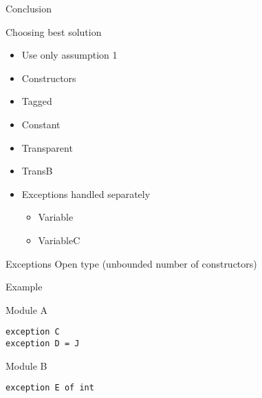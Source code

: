 \documentclass[presentation]{beamer}
\begin{document}
\begin{frame}[label={sec:orgheadline4}]{Conclusion}
  \begin{block}{Choosing best solution}
    \begin{itemize}
    \item Use only assumption 1
    \item Constructors
    \item Tagged
    \item Constant
    \item Transparent
    \item TransB
    \item Exceptions handled separately
      \begin{itemize}
      \item Variable
      \item VariableC
      \end{itemize}
    \end{itemize} 
  \end{block}
\end{frame}

\begin{frame}[fragile]{Exceptions}
Open type (unbounded number of constructors)
  \begin{block}{Example}
    \begin{block}{Module A}
\begin{verbatim}
exception C
exception D = J
\end{verbatim}
    \end{block}
    \begin{block}{Module B}
\begin{verbatim}
exception E of int
\end{verbatim}
    \end{block}
  \end{block}
\end{frame}
\end{document}
